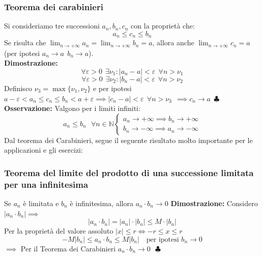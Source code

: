 \documentclass{article}
\begin{document}
\subsubsection{Teorema dei carabinieri}
Si consideriamo tre successioni $a_n, b_n, c_n$ con la proprietà che:
\[
    a_n \leq c_n \leq b_n
\]
Se risulta che $\lim_{n\to+\infty} a_n = \lim_{n\to+\infty} b_n = a$, allora
anche $\lim_{n\to+\infty} c_n = a$ (per ipotesi $a_n \to a \ \ b_n \to a$).\\
\textbf{Dimostrazione:}
\[
    \forall\varepsilon>0 \ \ \exists\nu_1 : |a_n - a| < \varepsilon \ \ \forall n > \nu_1
\]
\[
    \forall\varepsilon>0 \ \ \exists\nu_2 : |b_n - a| < \varepsilon \ \ \forall n > \nu_2
\]
Definisco $\nu_3 = \max\{\nu_1, \nu_2\}$ e per ipotesi $a-\varepsilon < a_n
    \leq c_n \leq b_n < a+\varepsilon \implies |c_n - a| < \varepsilon \ \ \forall
    n > \nu_3 \ \ \implies c_n \to a \ \ \clubsuit$ \textbf{Osservazione:} Valgono
per i limiti infiniti:
\[
    a_n \leq b_n \ \ \ \forall n\in \mathbb{N} \begin{cases}
        a_n\to+\infty \implies b_n\to+\infty \\
        b_n\to-\infty \implies a_n\to-\infty
    \end{cases}
\]
Dal teorema dei Carabinieri, segue il seguente risultato molto importante per
le applicazioni e gli esercizi:
\subsubsection{Teorema del limite del prodotto di una successione limitata per una infinitesima}
Se $a_n$ è limitata e $b_n$ è infinitesima, allora $a_n\cdot b_n \to 0$
\textbf{Dimostrazione:} Considero $|a_n\cdot b_n| \implies$
\[
    |a_n\cdot b_n| = |a_n|\cdot|b_n| \leq M\cdot|b_n|
\]
Per la proprietà del valore assoluto $|x| \leq r \iff -r \leq x \leq r$\\
\[
    -M|b_n| \leq a_n\cdot b_n \leq M|b_n| \ \ \ \text{ per ipotesi } b_n\to0
\]
$\implies$ Per il Teorema dei Carabinieri $a_n\cdot b_n \to 0 \ \ \ \clubsuit$
\end{document}

